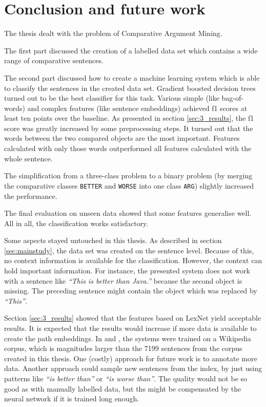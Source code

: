 \chapter{Conclusion and future work}
The thesis dealt with the problem of Comparative Argument Mining. 

The first part discussed the creation of a labelled data set which contains a wide range of comparative sentences.

The second part discussed how to create a machine learning system which is able to classify the sentences in the created data set. Gradient boosted decision trees turned out to be the best classifier for this task. Various simple (like bag-of-words) and complex features (like sentence embeddings) achieved f1 scores at least ten points over the baseline. As presented in section \ref{sec:3_results}, the f1 score was greatly increased by some preprocessing steps. It turned out that the words between the two compared objects are the most important. Features calculated with only those words outperformed all features calculated with the whole sentence.

The simplification from a three-class problem to a binary problem (by merging the comparative classes \texttt{BETTER} and \texttt{WORSE} into one class \texttt{ARG}) slightly increased the performance.

The final evaluation on unseen data showed that some features generalise well. All in all, the classification works satisfactory.
\newline


Some aspects stayed untouched in this thesis. As described in section \ref{sec:mainstudy}, the data set was created on the sentence level. Because of this, no context information is available for the classification. However, the context can hold important information. For instance, the presented system does not work with a sentence like \emph{\enquote{This is better than Java.}} because the second object is missing. The preceding sentence might contain the object which was replaced by \emph{\enquote{This}}. 

Section \ref{sec:3_results} showed that the features based on LexNet yield acceptable results. It is expected that the results would increase if more data is available to create the path embeddings. In \cite{DBLP:conf/acl/ShwartzGD16} and \cite{DBLP:journals/corr/ShwartzD16}, the systems were trained on a Wikipedia corpus, which is magnitudes larger than the 7199 sentences from the corpus created in this thesis. One (costly) approach for future work is to annotate more data. Another approach could sample new sentences from the index, by just using patterns like \emph{\enquote{is better than}} or \emph{\enquote{is worse than}}. The quality would not be so good as with manually labelled data, but ths might be compensated by the neural network if it is trained long enough.

